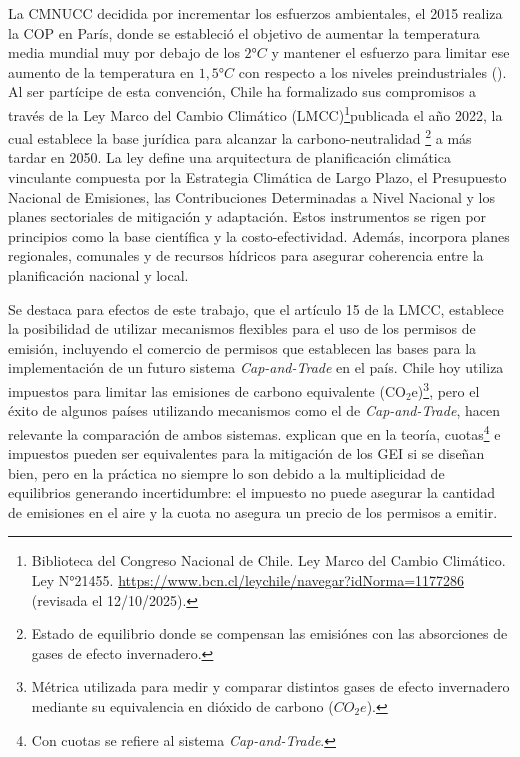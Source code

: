 La CMNUCC decidida por incrementar los esfuerzos ambientales, el 2015 realiza la COP en París, donde se estableció el objetivo de aumentar la temperatura media mundial muy por debajo de los $2°C$ y mantener el esfuerzo para limitar ese aumento de la temperatura en $1,5°C$ con respecto a los niveles preindustriales (). Al ser partícipe de esta convención, Chile ha formalizado sus compromisos a través de la Ley Marco del Cambio Climático (LMCC)\footnote{Biblioteca del Congreso Nacional de Chile. Ley Marco del Cambio Climático. Ley N°21455. \url{https://www.bcn.cl/leychile/navegar?idNorma=1177286} (revisada el 12/10/2025).}publicada el año 2022, la cual establece la base jurídica para alcanzar la carbono-neutralidad \footnote{Estado de equilibrio donde se compensan las emisiónes con las absorciones de gases de efecto invernadero.} a más tardar en 2050. La ley define una arquitectura de planificación climática vinculante compuesta por la Estrategia Climática de Largo Plazo, el Presupuesto Nacional de Emisiones, las Contribuciones Determinadas a Nivel Nacional y los planes sectoriales de mitigación y adaptación. Estos instrumentos se rigen por principios como la base científica y la costo-efectividad. Además, incorpora planes regionales, comunales y de recursos hídricos para asegurar coherencia entre la planificación nacional y local.\medskip

Se destaca para efectos de este trabajo, que el artículo 15 de la LMCC, establece la posibilidad de utilizar mecanismos flexibles para el uso de los permisos de emisión, incluyendo el comercio de permisos que establecen las bases para la implementación de un futuro sistema \emph{Cap-and-Trade} en el país. Chile hoy utiliza impuestos para limitar las emisiones de carbono equivalente (CO$_2$e)\footnote{Métrica utilizada para medir y comparar distintos gases de efecto invernadero mediante su equivalencia en dióxido de carbono ($CO_2e$).}, pero el éxito de algunos países utilizando mecanismos como el de \emph{Cap-and-Trade}, hacen relevante la comparación de ambos sistemas.  explican que en la teoría, cuotas\footnote{Con cuotas se refiere al sistema \emph{Cap-and-Trade}.} e impuestos pueden ser equivalentes para la mitigación de los GEI si se diseñan bien, pero en la práctica no siempre lo son debido a la multiplicidad de equilibrios generando incertidumbre: el impuesto no puede asegurar la cantidad de emisiones en el aire y la cuota no asegura un precio de los permisos a emitir.\medskip

